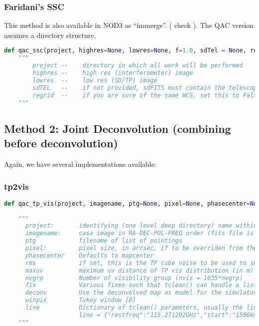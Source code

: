 \documentclass[12pt,a4paper]{article}
\begin{document}
\subsubsection{Faridani's SSC}

This method is also available in NOD3 as ``immerge''. ( check ). The QAC version assumes a directory structure.

\begin{lstlisting}[language=Python]
def qac_ssc(project, highres=None, lowres=None, f=1.0, sdTel = None, regrid=True, cleanup=True, label="", niteridx=0, name="dirtymap"):
    """
        project --    directory in which all work will be performed
        highres --    high res (interferometer) image
        lowres  --    low res (SD/TP) image
        sdTEL   --    if not provided, sdFITS must contain the telescope
        regrid  --    if you are sure of the same WCS, set this to False
    """
\end{lstlisting}

\subsection{Method 2: Joint Deconvolution (combining before deconvolution)}

Again, we have several implementations available:

\subsubsection{tp2vis}

\begin{lstlisting}[language=Python]
def qac_tp_vis(project, imagename, ptg=None, pixel=None, phasecenter=None, rms=None, maxuv=10.0, nvgrp=4, fix=1, deconv=True, winpix=0, **line):    
           
    """
      project:       identifying (one level deep directory) name within which all files are places
      imagename:     casa image in RA-DEC-POL-FREQ order (fits file is ok too)
      ptg            filename of list of pointings
      pixel:         pixel size, in arcsec, if to be overriden from the input map. 
      phasecenter    Defaults to mapcenter
      rms            if set, this is the TP cube noise to be used to set the weights
      maxuv          maximum uv distance of TP vis distribution (in m)  [10m] 
      nvgrp          Number of visibility group (nvis = 1035*nvgrp)
      fix            Various fixes such that tclean() can handle a list of ms [fix=1]
      deconv         Use the deconvolved map as model for the simulator.
      winpix         Tukey window [0]
      line           Dictionary of tclean() parameters, usually the line parameters are useful, e.g.
                     line = {"restfreq":"115.271202GHz","start":"1500km/s", "width":"5km/s","nchan":5}
    """
\end{lstlisting}
\end{document}
